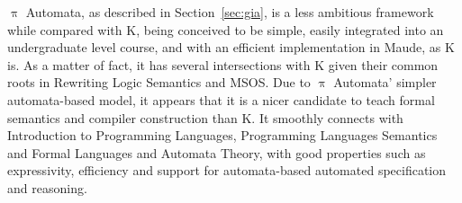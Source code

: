 \documentclass[a4paper,openany]{book}
\begin{document}
$\uppi$ Automata, as described in Section~\ref{sec:gia}, is a less ambitious framework while compared with K, being conceived to be simple, easily integrated into an undergraduate level course, and with an efficient implementation in Maude, as K is. As a matter of fact, it has several intersections with K given their common roots in Rewriting Logic Semantics and MSOS. Due to $\uppi$ Automata' simpler automata-based model, it appears that it is a nicer candidate to teach formal semantics and compiler construction than K. It smoothly connects with Introduction to Programming Languages, Programming Languages Semantics and Formal Languages and Automata Theory, with good properties such as expressivity, efficiency and support for automata-based automated specification and reasoning. 
%
%
%
%
%
\end{document}
